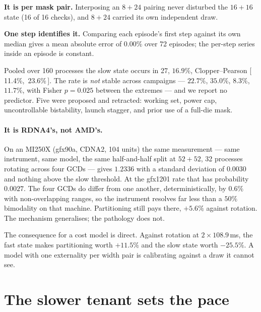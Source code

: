 \documentclass[sigconf,nonacm]{acmart}
\newcommand{\ci}[2]{[\,#1,\ #2\,]}
\begin{document}
\textbf{It is per mask pair.} Interposing an $8{+}24$ pairing never
disturbed the $16{+}16$ state (16 of 16 checks), and $8{+}24$ carried its
own independent draw.

\textbf{One step identifies it.} Comparing each episode's first step
against its own median gives a mean absolute error of $0.00\%$ over 72
episodes; the per-step series inside an episode is constant.

Pooled over 160 processes the slow state occurs in 27, $16.9\%$,
Clopper--Pearson \ci{11.4\%}{23.6\%}. The rate is \emph{not} stable
across campaigns --- $22.7\%$, $35.0\%$, $8.3\%$, $11.7\%$, with Fisher
$p=0.025$ between the extremes --- and we report no predictor. Five were
proposed and retracted: working set, power cap, uncontrollable
bistability, launch stagger, and prior use of a full-die mask.

\paragraph{It is RDNA4's, not AMD's.} On an MI250X (gfx90a, CDNA2, 104
units) the same measurement --- same instrument, same model, the same
half-and-half split at $52{+}52$, 32 processes rotating across four GCDs
--- gives $1.2336$ with a standard deviation of $0.0030$ and nothing
above the slow threshold. At the gfx1201 rate that has probability
$0.0027$. The four GCDs do differ from one another, deterministically, by
$0.6\%$ with non-overlapping ranges, so the instrument resolves far less
than a $50\%$ bimodality on that machine. Partitioning still pays there,
$+5.6\%$ against rotation. The mechanism generalises; the pathology does
not.

The consequence for a cost model is direct. Against rotation at
$2\times108.9$\,ms, the fast state makes partitioning worth $+11.5\%$ and
the slow state worth $-25.5\%$. A model with one externality per width
pair is calibrating against a draw it cannot see.

\section{The slower tenant sets the pace}
\label{sec:mismatch}
\end{document}
